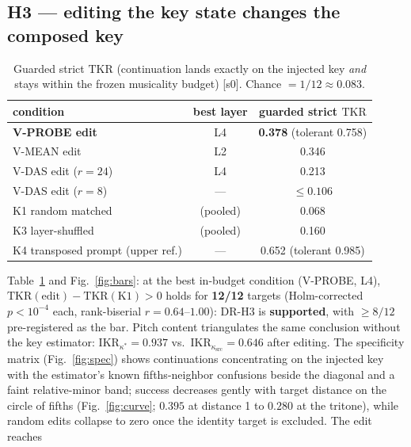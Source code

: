 \documentclass[conference]{IEEEtran}
\newcommand{\tkr}{\mathrm{TKR}}
\newcommand{\ikr}{\mathrm{IKR}}
\begin{document}
\subsection{H3 --- editing the key state changes the composed key}
\begin{table}[t]
\centering\small
\caption{Guarded strict $\tkr$ (continuation lands exactly on the injected
key \emph{and} stays within the frozen musicality budget) [s0]. Chance
$=1/12\approx0.083$.}
\label{tab:tkr}
\begin{tabular}{@{}lcc@{}}
\toprule
condition & best layer & guarded strict $\tkr$\\
\midrule
\textbf{V-PROBE edit} & L4 & \textbf{0.378} \; (tolerant 0.758)\\
V-MEAN edit & L2 & 0.346\\
V-DAS edit ($r{=}24$) & L4 & 0.213\\
V-DAS edit ($r{=}8$) & --- & $\leq 0.106$\\
\midrule
K1 random matched & (pooled) & 0.068\\
K3 layer-shuffled & (pooled) & 0.160\\
K4 transposed prompt (upper ref.) & --- & 0.652 \; (tolerant 0.985)\\
\bottomrule
\end{tabular}
\end{table}
Table~\ref{tab:tkr} and Fig.~\ref{fig:bars}: at the best in-budget condition
(V-PROBE, L4), $\tkr(\text{edit})-\tkr(\text{K1})>0$ holds for \textbf{12/12} targets
(Holm-corrected $p<10^{-4}$ each, rank-biserial $r=0.64$--$1.00$): DR-H3 is
\textbf{supported}, with $\geq 8/12$ pre-registered as the bar. Pitch content
triangulates the same conclusion without the key estimator:
$\ikr_{\kappa^*}=0.937$ vs.\ $\ikr_{\kappa_{\mathrm{src}}}=0.646$ after
editing. The specificity matrix (Fig.~\ref{fig:spec}) shows continuations
concentrating on the injected key with the estimator's known
fifths-neighbor confusions beside the diagonal and a faint relative-minor
band; success decreases gently with target distance on the circle of fifths
(Fig.~\ref{fig:curve}; $0.395$ at distance 1 to $0.280$ at the tritone),
while random edits collapse to zero once the identity target is excluded.
The edit reaches
\end{document}
